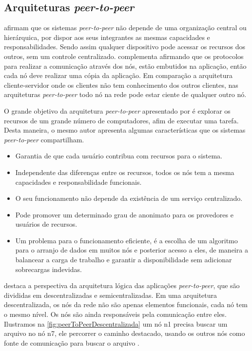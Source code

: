 \subsection{Arquiteturas \textit{peer-to-peer}}\label{sub:peerToPeer}

 afirmam que os sistemas \textit{peer-to-peer} não depende de uma organização central ou hierárquica, por dispor aos seus integrantes as mesmas capacidades e responsabilidades. Sendo assim qualquer dispositivo pode acessar os recursos dos outros, sem um controle centralizado.  complementa afirmando que os protocolos para realizar a comunicação através dos nós, estão embutidos na aplicação, então cada nó deve realizar uma cópia da aplicação. Em comparação a arquitetura cliente-servidor onde os clientes não tem conhecimento dos outros clientes, nas arquiteturas \textit{peer-to-peer} todo nó na rede pode estar ciente de qualquer outro nó.

O grande objetivo da arquitetura \textit{peer-to-peer} apresentado por  é explorar os recursos de um grande número de computadores, afim de executar uma tarefa. Desta maneira, o mesmo autor apresenta algumas características que os sistemas \textit{peer-to-peer} compartilham.
\begin{itemize}
	\item Garantia de que cada usuário contribua com recursos para o sistema.
	\item Independente das diferenças entre os recursos, todos os nós tem a mesma capacidades e responsabilidade funcionais.
	\item O seu funcionamento não depende da existência de um serviço centralizado.
	\item Pode promover um determinado grau de anonimato para os provedores e usuários de recursos.
	\item Um problema para o funcionamento eficiente, é a escolha de um algoritmo  para o arranjo de dados em muitos nós e posterior acesso a eles, de maneira a balancear a carga de trabalho e garantir a disponibilidade sem adicionar sobrecargas indevidas. 
\end{itemize}

 destaca a perspectiva da arquitetura lógica das aplicações \textit{peer-to-peer}, que são divididas em descentralizadas e semicentralizadas. 
Em uma arquitetura descentralizada, os nós da rede não são apenas elementos funcionais, cada nó tem o mesmo nível. Os nós são ainda responsáveis pela comunicação entre eles. Ilustramos na \autoref{fig:peerToPeerDescentralizada} um nó n1 precisa buscar um arquivo no nó n7, ele percorrer o caminho destacado, usando os outros nós como fonte de comunicação para buscar o arquivo \cite{sommerville2007engenharia,kamienski2005colaboraccao}.


